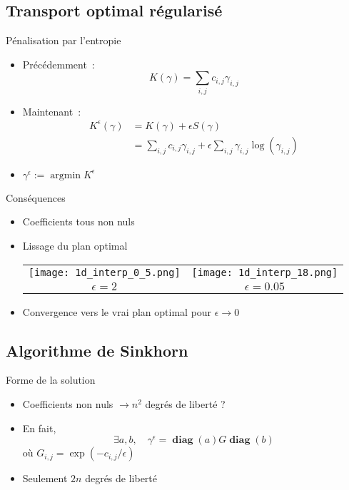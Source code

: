\documentclass{beamer}
\DeclareMathOperator*{\argmin}{argmin}
\DeclareMathOperator{\diag}{\mathbf{diag}}
\begin{document}
\subsection{Transport optimal régularisé}

\begin{frame}{Pénalisation par l'entropie}
\begin{itemize}
\item Précédemment~:
\[K(\gamma) = \sum_{i,j} c_{i,j} \gamma_{i,j} \]
\pause
\item Maintenant~:
\begin{equation*}\label{eq:keps}
\begin{split}
K^\epsilon (\gamma) 
 &= K(\gamma) + \epsilon S(\gamma) \\
&= \sum_{i,j} c_{i,j} \gamma_{i,j} + \epsilon \sum_{i,j} \gamma_{i,j} \log(\gamma_{i,j}) 
\end{split}\end{equation*}
\item $\gamma^\epsilon := \argmin K^\epsilon $
\end{itemize}
\end{frame}

\begin{frame}{Conséquences}
\begin{itemize}
\item Coefficients tous non nuls
\item Lissage du plan optimal
\begin{tabular}{c c}
\texttt{[image: 1d\_interp\_0\_5.png]} & 
\texttt{[image: 1d\_interp\_18.png]} \\
$\epsilon = 2$ & $\epsilon = 0.05$
\end{tabular}
\item Convergence vers le \og vrai \fg plan optimal pour $\epsilon \rightarrow 0$
\end{itemize}
\end{frame}



\subsection{Algorithme de Sinkhorn}

\begin{frame}{Forme de la solution}
\begin{itemize}
\item Coefficients non nuls $\rightarrow n^2$ degrés de liberté ?
\item En fait,
\[\exists a,b, \quad \gamma^\epsilon = \diag(a) G \diag(b) \]
où $G_{i,j} = \exp(-c_{i,j}/\epsilon)$
\item Seulement $2n$ degrés de liberté
\end{itemize}
\end{frame}
\end{document}
